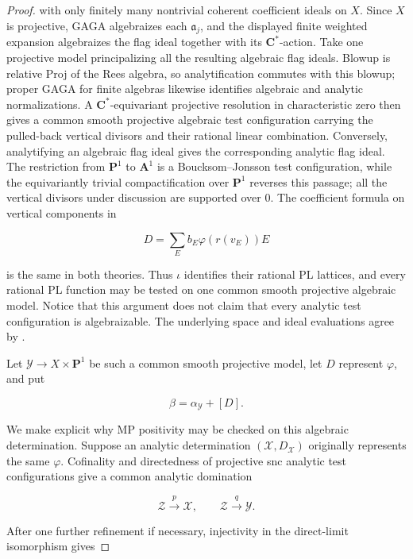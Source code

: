 \begin{proof}
with only finitely many nontrivial coherent coefficient ideals on \(X\).
Since \(X\) is projective, GAGA algebraizes each \(\mathfrak a_j\), and
the displayed finite weighted expansion algebraizes the flag ideal
together with its \(\mathbf C^*\)-action.  Take one projective model
principalizing all the resulting algebraic flag ideals.  Blowup is
relative Proj of the Rees algebra, so analytification commutes with this
blowup; proper GAGA for finite algebras likewise identifies algebraic and
analytic normalizations.  A \(\mathbf C^*\)-equivariant projective
resolution in characteristic zero then gives a common smooth projective
algebraic test configuration carrying the pulled-back vertical divisors
and their rational linear combination.  Conversely, analytifying an
algebraic flag ideal gives the corresponding analytic flag ideal.  The
restriction from \(\mathbf P^1\) to \(\mathbf A^1\) is a
Boucksom--Jonsson test configuration, while the equivariantly trivial
compactification over \(\mathbf P^1\) reverses this passage; all the
vertical divisors under discussion are supported over \(0\).
The
coefficient formula on vertical components in

\[
                    D=\sum_E b_E\varphi(r(v_E))E
\]

is the same in both theories.  Thus \(\iota\) identifies their rational
PL lattices, and every rational PL function may be tested on one common
smooth projective algebraic model.  Notice that this argument does not
claim that every analytic test configuration is algebraizable.  The
underlying space and ideal evaluations agree by
\cite[Remark~1.3.3]{MP24}.

Let \(\mathcal Y\to X\times\mathbf P^1\) be such a common smooth
projective model, let \(D\) represent \(\varphi\), and put

\[
                         \beta=\alpha_{\mathcal Y}+[D].
\]

We make explicit why MP positivity may be checked on this algebraic
determination.  Suppose an analytic determination
\((\mathcal X,D_{\mathcal X})\) originally represents the same
\(\varphi\).  Cofinality and directedness of projective snc analytic test
configurations \cite[Remark~2.5.2]{MP24} give a common analytic
domination

\[
 \mathcal Z\xrightarrow{p}\mathcal X,
 \qquad
 \mathcal Z\xrightarrow{q}\mathcal Y .
\]

After one further refinement if necessary, injectivity in the direct-limit
isomorphism \cite[Theorem~2.6.4]{MP24} gives


\end{proof}
